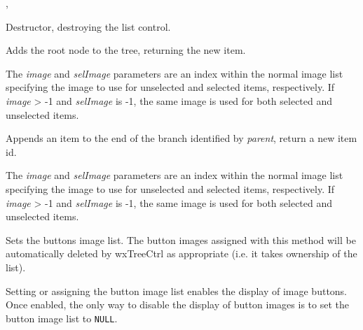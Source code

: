 , 


\label{wxtreectrldtor}


Destructor, destroying the list control.


\label{wxtreectrladdroot}


Adds the root node to the tree, returning the new item.

The {\it image} and {\it selImage} parameters are an index within
the normal image list specifying the image to use for unselected and
selected items, respectively.
If {\it image} > -1 and {\it selImage} is -1, the same image is used for
both selected and unselected items.


\label{wxtreectrlappenditem}


Appends an item to the end of the branch identified by {\it parent}, return a new item id.

The {\it image} and {\it selImage} parameters are an index within
the normal image list specifying the image to use for unselected and
selected items, respectively.
If {\it image} > -1 and {\it selImage} is -1, the same image is used for
both selected and unselected items.


\label{wxtreectrlassignbuttonsimagelist}


Sets the buttons image list. The button images assigned with this method will
be automatically deleted by wxTreeCtrl as appropriate
(i.e. it takes ownership of the list).

Setting or assigning the button image list enables the display of image buttons.
Once enabled, the only way to disable the display of button images is to set
the button image list to {\tt NULL}.

